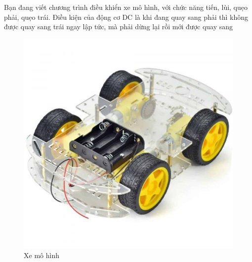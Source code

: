 Bạn đang viết chương trình điều khiển xe mô hình, với chức năng tiến, lùi, quẹo phải, quẹo trái. Điều kiện của động cơ DC là khi đang quay sang phải thì không được quay sang trái ngay lập tức, mà phải dừng lại rồi mới được quay sang 

\begin{figure}[h!]
    \centering
    \includegraphics[width=0.8\linewidth]{images/xe_mo_hinh.jpg}
    \caption{Xe mô hình}
\end{figure}

